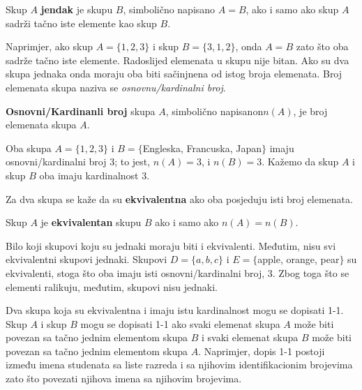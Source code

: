 \documentclass[a4paper,14pt,svgnames]{article}
\begin{document}
\reversemarginpar
\color{white}
\color{black}

\begin{tcolorbox}
Skup $A$ \textbf{jendak} je skupu $B$, simbolično napisano $A=B$, ako i samo ako skup $A$ sadrži tačno iste elemente kao skup $B$.
\end{tcolorbox}\smallskip
\noindent Naprimjer, ako skup $A=\{1, 2, 3\}$ i skup $B=\{3, 1, 2\}$, onda $A=B$ zato što oba sadrže tačno iste elemente. Radoslijed elemenata u skupu nije bitan. Ako su dva skupa jednaka onda moraju oba biti sačinjnena od istog broja elemenata. Broj elemenata skupa naziva se \textit{osnovnu/kardinalni broj}.\smallskip
\begin{tcolorbox}
\textbf{Osnovni/Kardinanli broj} skupa $A$, simbolično napisanon$n(A)$, je broj elemenata skupa $A$.
\end{tcolorbox}\smallskip
Oba skupa $A=\{1, 2, 3\}$ i $B=\{$Engleska, Francuska, Japan$\}$ imaju osnovni/kardinalni broj 3; to jest, $n(A)=3$, i $n(B)=3$. Kažemo da skup $A$ i skup $B$ oba imaju kardinalnost 3.\par
Za dva skupa se kaže da su \textbf{ekvivalentna} ako oba posjeduju isti broj elemenata.\smallskip
\begin{tcolorbox}
Skup $A$ je \textbf{ekvivalentan} skupu $B$ ako i samo ako $n(A)=n(B)$.
\end{tcolorbox}\smallskip
\noindent Bilo koji skupovi koju su jednaki moraju biti i ekvivalenti. Međutim, nisu svi ekvivalentni skupovi jednaki. Skupovi $D=\{a, b, c\}$ i $E=\{$apple, orange, pear$\}$ su ekvivalenti, stoga što oba imaju isti osnovni/kardinalni broj, 3. Zbog toga što se elementi ralikuju, međutim, skupovi nisu jednaki.\par
Dva skupa koja su ekvivalentna i  imaju istu kardinalnost mogu se dopisati 1-1. Skup $A$ i skup $B$ mogu se dopisati 1-1 ako svaki elemenat skupa $A$ može biti povezan sa tačno jednim elementom skupa $B$ i svaki elemenat skupa $B$ može biti povezan sa tačno jednim elementom skupa $A$. Naprimjer, dopis 1-1 postoji između imena studenata sa liste razreda i sa njihovim identifikacionim brojevima zato što povezati njihova imena sa njihovim brojevima.\medskip
\end{document}
